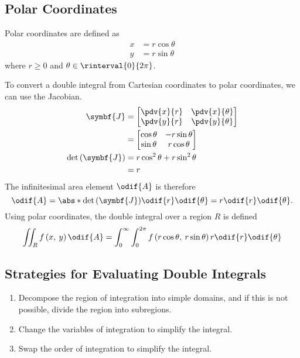 \documentclass{article}
\begin{document}
\subsection{Polar Coordinates}
\begin{definition}
    Polar coordinates are defined as
    \begin{align*}
        x & = r \cos{\theta} \\
        y & = r \sin{\theta}
    \end{align*}
    where \(r \geqslant 0\) and \(\theta \in \rinterval{0}{2\pi}\).
\end{definition}
To convert a double integral from Cartesian coordinates to polar
coordinates, we can use the Jacobian.
\begin{align*}
    \symbf{J}                      & =
    \begin{bmatrix}
        \displaystyle\pdv{x}{r} & \displaystyle\pdv{x}{\theta} \\
        \displaystyle\pdv{y}{r} & \displaystyle\pdv{y}{\theta} \\
    \end{bmatrix}
    \\
                                   & =
    \begin{bmatrix}
        \cos{\theta} & -r \sin{\theta} \\
        \sin{\theta} & r \cos{\theta}  \\
    \end{bmatrix}
    \\
    \det{\left( \symbf{J} \right)} & = r \cos^2{\theta} + r \sin^2{\theta} \\
                                   & = r
\end{align*}
The infinitesimal area element \(\odif{A}\) is therefore
\begin{equation*}
    \odif{A} = \abs*{\det{\left( \symbf{J} \right)}} \odif{r}\odif{\theta} = r \odif{r}\odif{\theta}.
\end{equation*}
Using polar coordinates, the double integral over a region \(R\) is
defined
\begin{equation*}
    \iint_R f\left( x,\: y \right) \odif{A} = \int_0^\infty \int_0^{2\pi} f\left( r \cos{\theta},\: r \sin{\theta} \right) r \odif{r}\odif{\theta}
\end{equation*}
\subsection{Strategies for Evaluating Double Integrals}
\begin{enumerate}
    \item Decompose the region of integration into simple domains, and
    if this is not possible, divide the region into subregions.
    \item Change the variables of integration to simplify the integral.
    \item Swap the order of integration to simplify the integral.
\end{enumerate}
\end{document}
